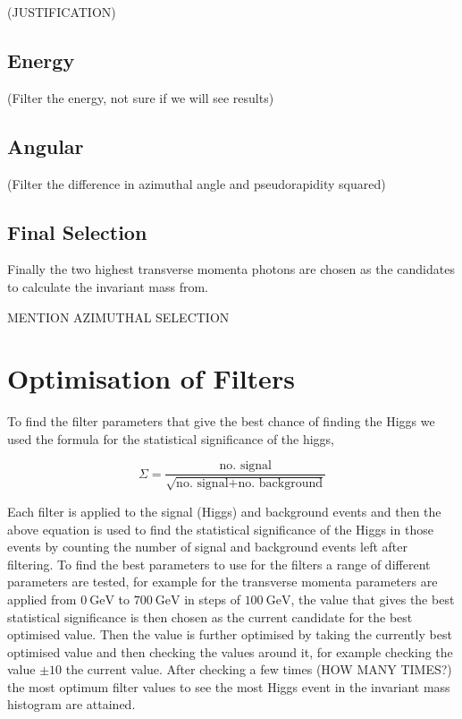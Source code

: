 \documentclass[11pt]{amsart}
\begin{document}
\begin{multicols}{2}
(JUSTIFICATION)

\subsection{Energy}

(Filter the energy, not sure if we will see results)

\subsection{Angular}

(Filter the difference in azimuthal angle and pseudorapidity squared)

\subsection{Final Selection}

Finally the two highest transverse momenta photons are chosen as the candidates to calculate the invariant mass from.

MENTION AZIMUTHAL SELECTION


\section{Optimisation of Filters}

To find the filter parameters that give the best chance of finding the Higgs we used the formula for the statistical significance of the higgs,

\begin{equation}
  \label{eq:significance}
  \Sigma = \frac{\text{no. signal}}{\sqrt{\text{no. signal} + \text{no. background}}}
\end{equation}

Each filter is applied to the signal (Higgs) and background events and then the above equation is used to find the statistical significance of the Higgs in those events by counting the number of signal and background events left after filtering. To find the best parameters to use for the filters a range of different parameters are tested, for example for the transverse momenta parameters are applied from $\SI{0}{\giga\electronvolt}$ to $\SI{700}{\giga\electronvolt}$ in steps of $\SI{100}{\giga\electronvolt}$, the value that gives the best statistical significance is then chosen as the current candidate for the best optimised value. Then the value is further optimised by taking the currently best optimised value and then checking the values around it, for example checking the value $\pm 10$ the current value. After checking a few times (HOW MANY TIMES?) the most optimum filter values to see the most Higgs event in the invariant mass histogram are attained.


\end{multicols}
\end{document}
